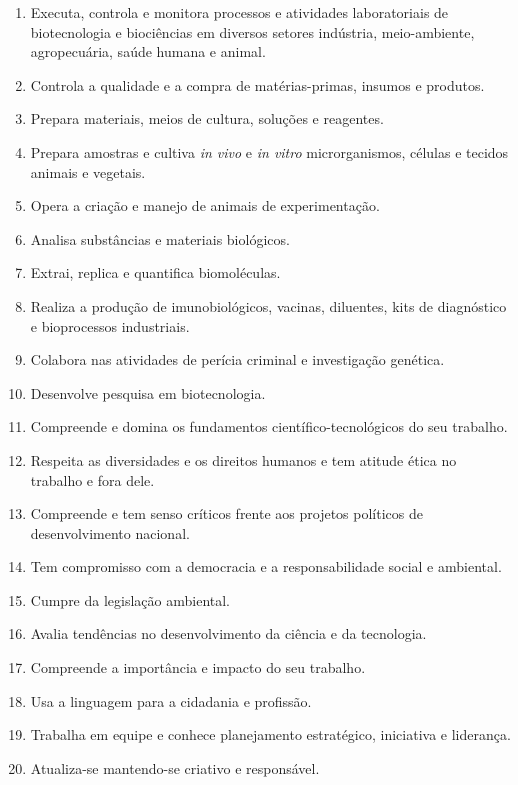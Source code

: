 \documentclass[11pt,fleqn]{book} %
\begin{document}
\begin{enumerate}
	\item\label{perfil01} Executa, controla e monitora processos e atividades laboratoriais de biotecnologia e biociências em diversos setores indústria, meio-ambiente, agropecuária, saúde humana e animal.
	\item\label{perfil02} Controla a qualidade e a compra de matérias-primas, insumos e produtos.
	\item\label{perfil03} Prepara materiais, meios de cultura, soluções e reagentes.
	\item\label{perfil04} Prepara amostras e cultiva \textit{in vivo} e \textit{in vitro} microrganismos, células e tecidos animais e vegetais.
	\item\label{perfil05} Opera a criação e manejo de animais de experimentação.
	\item\label{perfil06} Analisa substâncias e materiais biológicos.
	\item\label{perfil07} Extrai, replica e quantifica biomoléculas.
	\item\label{perfil08} Realiza a produção de imunobiológicos, vacinas, diluentes, kits de diagnóstico e bioprocessos industriais.
	\item\label{perfil09} Colabora nas atividades de perícia criminal e investigação genética. 
	\item\label{perfil10} Desenvolve pesquisa em biotecnologia.
	\item\label{perfil11} Compreende e domina os fundamentos científico-tecnológicos do seu trabalho.
	\item\label{perfil12} Respeita as diversidades e os direitos humanos e tem atitude ética no trabalho e fora dele.
	\item\label{perfil13} Compreende e tem senso críticos frente aos projetos políticos de desenvolvimento nacional.
	\item\label{perfil14} Tem compromisso com a democracia e a responsabilidade social e ambiental.
	\item\label{perfil15} Cumpre da legislação ambiental.
	\item\label{perfil16} Avalia tendências no desenvolvimento da ciência e da tecnologia.
	\item\label{perfil17} Compreende a importância e impacto do seu trabalho.
	\item\label{perfil18} Usa a linguagem para a cidadania e profissão.
	\item\label{perfil19} Trabalha em equipe e conhece planejamento estratégico, iniciativa e liderança.
	\item\label{perfil20} Atualiza-se mantendo-se criativo e responsável.
\end{enumerate}
\end{document}
